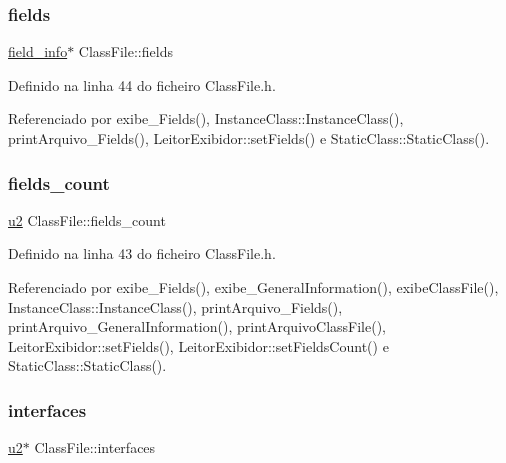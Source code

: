 \mbox{\label{classClassFile_aa324f88c75aa96c632f8c57d010aab0c}} 
\subsubsection{\texorpdfstring{fields}{fields}}
{\footnotesize\ttfamily \hyperlink{structfield__info}{field\+\_\+info}$\ast$ Class\+File\+::fields}



Definido na linha 44 do ficheiro Class\+File.\+h.



Referenciado por exibe\+\_\+\+Fields(), Instance\+Class\+::\+Instance\+Class(), print\+Arquivo\+\_\+\+Fields(), Leitor\+Exibidor\+::set\+Fields() e Static\+Class\+::\+Static\+Class().

\mbox{\label{classClassFile_acea207ee523fbc16611d3cf436c390e0}} 
\subsubsection{\texorpdfstring{fields\+\_\+count}{fields\_count}}
{\footnotesize\ttfamily \hyperlink{BasicTypes_8h_a732cde1300aafb73b0ea6c2558a7a54f}{u2} Class\+File\+::fields\+\_\+count}



Definido na linha 43 do ficheiro Class\+File.\+h.



Referenciado por exibe\+\_\+\+Fields(), exibe\+\_\+\+General\+Information(), exibe\+Class\+File(), Instance\+Class\+::\+Instance\+Class(), print\+Arquivo\+\_\+\+Fields(), print\+Arquivo\+\_\+\+General\+Information(), print\+Arquivo\+Class\+File(), Leitor\+Exibidor\+::set\+Fields(), Leitor\+Exibidor\+::set\+Fields\+Count() e Static\+Class\+::\+Static\+Class().

\mbox{\label{classClassFile_af599de97e062c98966470f1590496425}} 
\subsubsection{\texorpdfstring{interfaces}{interfaces}}
{\footnotesize\ttfamily \hyperlink{BasicTypes_8h_a732cde1300aafb73b0ea6c2558a7a54f}{u2}$\ast$ Class\+File\+::interfaces}



